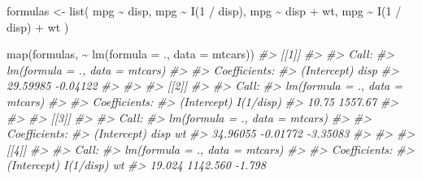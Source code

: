 \documentclass[
]{book}
\newenvironment{Shaded}{\begin{snugshade}}{\end{snugshade}}
\newcommand{\AttributeTok}[1]{\textcolor[rgb]{0.77,0.63,0.00}{#1}}
\newcommand{\CommentTok}[1]{\textcolor[rgb]{0.56,0.35,0.01}{\textit{#1}}}
\newcommand{\DecValTok}[1]{\textcolor[rgb]{0.00,0.00,0.81}{#1}}
\newcommand{\FunctionTok}[1]{\textcolor[rgb]{0.00,0.00,0.00}{#1}}
\newcommand{\NormalTok}[1]{#1}
\newcommand{\OtherTok}[1]{\textcolor[rgb]{0.56,0.35,0.01}{#1}}
\newcommand{\SpecialCharTok}[1]{\textcolor[rgb]{0.00,0.00,0.00}{#1}}
\begin{document}
\begin{Shaded}
\begin{Highlighting}[]
\NormalTok{formulas }\OtherTok{\textless{}{-}} \FunctionTok{list}\NormalTok{(}
\NormalTok{  mpg }\SpecialCharTok{\textasciitilde{}}\NormalTok{ disp,}
\NormalTok{  mpg }\SpecialCharTok{\textasciitilde{}} \FunctionTok{I}\NormalTok{(}\DecValTok{1} \SpecialCharTok{/}\NormalTok{ disp),}
\NormalTok{  mpg }\SpecialCharTok{\textasciitilde{}}\NormalTok{ disp }\SpecialCharTok{+}\NormalTok{ wt,}
\NormalTok{  mpg }\SpecialCharTok{\textasciitilde{}} \FunctionTok{I}\NormalTok{(}\DecValTok{1} \SpecialCharTok{/}\NormalTok{ disp) }\SpecialCharTok{+}\NormalTok{ wt}
\NormalTok{)}

\FunctionTok{map}\NormalTok{(formulas, }\SpecialCharTok{\textasciitilde{}} \FunctionTok{lm}\NormalTok{(}\AttributeTok{formula =}\NormalTok{ ., }\AttributeTok{data =}\NormalTok{ mtcars))}
\CommentTok{\#\textgreater{} [[1]]}
\CommentTok{\#\textgreater{} }
\CommentTok{\#\textgreater{} Call:}
\CommentTok{\#\textgreater{} lm(formula = ., data = mtcars)}
\CommentTok{\#\textgreater{} }
\CommentTok{\#\textgreater{} Coefficients:}
\CommentTok{\#\textgreater{} (Intercept)         disp  }
\CommentTok{\#\textgreater{}    29.59985     {-}0.04122  }
\CommentTok{\#\textgreater{} }
\CommentTok{\#\textgreater{} }
\CommentTok{\#\textgreater{} [[2]]}
\CommentTok{\#\textgreater{} }
\CommentTok{\#\textgreater{} Call:}
\CommentTok{\#\textgreater{} lm(formula = ., data = mtcars)}
\CommentTok{\#\textgreater{} }
\CommentTok{\#\textgreater{} Coefficients:}
\CommentTok{\#\textgreater{} (Intercept)    I(1/disp)  }
\CommentTok{\#\textgreater{}       10.75      1557.67  }
\CommentTok{\#\textgreater{} }
\CommentTok{\#\textgreater{} }
\CommentTok{\#\textgreater{} [[3]]}
\CommentTok{\#\textgreater{} }
\CommentTok{\#\textgreater{} Call:}
\CommentTok{\#\textgreater{} lm(formula = ., data = mtcars)}
\CommentTok{\#\textgreater{} }
\CommentTok{\#\textgreater{} Coefficients:}
\CommentTok{\#\textgreater{} (Intercept)         disp           wt  }
\CommentTok{\#\textgreater{}    34.96055     {-}0.01772     {-}3.35083  }
\CommentTok{\#\textgreater{} }
\CommentTok{\#\textgreater{} }
\CommentTok{\#\textgreater{} [[4]]}
\CommentTok{\#\textgreater{} }
\CommentTok{\#\textgreater{} Call:}
\CommentTok{\#\textgreater{} lm(formula = ., data = mtcars)}
\CommentTok{\#\textgreater{} }
\CommentTok{\#\textgreater{} Coefficients:}
\CommentTok{\#\textgreater{} (Intercept)    I(1/disp)           wt  }
\CommentTok{\#\textgreater{}      19.024     1142.560       {-}1.798}
\end{Highlighting}
\end{Shaded}
\end{document}
